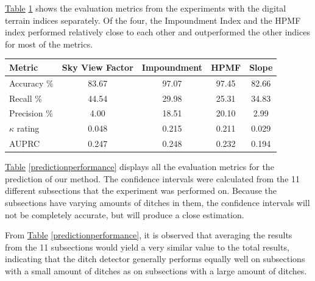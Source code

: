 \documentclass[]{interact}
\theoremstyle{plain}%
\theoremstyle{definition}
\theoremstyle{remark}
\begin{document}
\hyperref[recreatedpredictionperformance]{Table} \ref{recreatedpredictionperformance} shows the evaluation metrics from the experiments with the digital terrain indices separately. Of the four, the Impoundment Index and the HPMF index performed relatively close to each other and outperformed the other indices for most of the metrics.

\begin{table}[!htb]
    {\begin{tabular}{lcccc} \toprule
        Metric & Sky View Factor & Impoundment & HPMF & Slope\\ \midrule
        Accuracy \%     & 83.67 & 97.07 & 97.45 & 82.66 \\
        Recall \%       & 44.54 & 29.98 & 25.31 & 34.83 \\
        Precision \%    &{ 4.00}  & 18.51 & 20.10 & { 2.99} \\
        $\kappa$ rating & 0.048 & 0.215 & 0.211 & 0.029 \\
        AUPRC & 0.247 & 0.248 & 0.232 & 0.194 \\ \bottomrule
    \end{tabular}}
    \label{recreatedpredictionperformance}
\end{table}

\hyperref[predictionperformance]{Table} \ref{predictionperformance} displays all the evaluation metrics for the prediction of our method. The confidence intervals were calculated from the 11 different subsections that the experiment was performed on. Because the subsections have varying amounts of ditches in them, the confidence intervals will not be completely accurate, but will produce a close estimation.

From \hyperref[predictionperformance]{Table} \ref{predictionperformance}, it is observed that averaging the results from the 11 subsections would yield a very similar value to the total results, indicating that the ditch detector generally performs equally well on subsections with a small amount of ditches as on subsections with a large amount of ditches.
\end{document}
